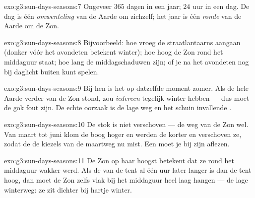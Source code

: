 \begin{solution}{exo:g3:sun-days-seasons:7}
Ongeveer $365$ dagen in een jaar; $24$ uur in een dag. De dag is één
\emph{omwenteling} van de Aarde om zichzelf; het jaar is één
\emph{ronde} van de Aarde om de Zon.
\end{solution}

\begin{solution}{exo:g3:sun-days-seasons:8}
Bijvoorbeeld: hoe vroeg de straatlantaarns aangaan (donker vóór het
avondeten betekent winter); hoe hoog de Zon rond het middaguur staat;
hoe lang de middagschaduwen zijn; of je na het avondeten nog bij
daglicht buiten kunt spelen.
\end{solution}

\begin{solution}{exo:g3:sun-days-seasons:9}
Bij hen is het op datzelfde moment zomer. Als de hele Aarde verder van
de Zon stond, zou \emph{iedereen} tegelijk winter hebben --- dus moet
de gok fout zijn. De echte oorzaak is de lage weg en het schuin
invallende .
\end{solution}

\begin{solution}{exo:g3:sun-days-seasons:10}
De stok is niet verschoven --- de weg van de Zon wel. Van maart tot
juni klom de boog hoger en werden de  korter en
verschoven ze, zodat de  de kiezels van de maartweg nu mist. Een
 moet je bij zijn  aflezen.
\end{solution}

\begin{solution}{exo:g3:sun-days-seasons:11}
De Zon op haar hoogst betekent dat ze rond het middaguur wakker werd.
Als de  van de tent al één uur later langer is dan de tent
hoog, dan moet de Zon zelfs vlak bij het middaguur heel laag hangen
--- de lage winterweg: ze zit dichter bij hartje winter.
\end{solution}
